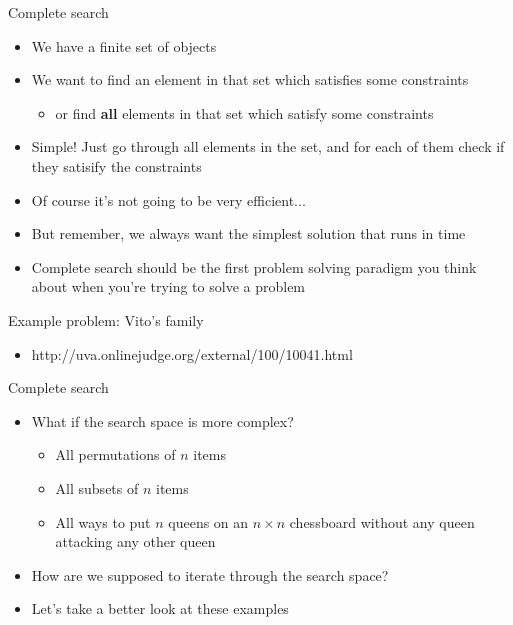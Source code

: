 \documentclass[12pt,t]{beamer}
\newcommand{\bi}{\begin{itemize}}
\newcommand{\ei}{\end{itemize}}
\begin{document}
\begin{frame}{Complete search}
    \vspace{5pt}
    \bi
        \item We have a finite set of objects
        \item We want to find an element in that set which satisfies some constraints
            \bi
                \item or find \textbf{all} elements in that set which satisfy some constraints
            \ei

        \vspace{5pt}
        \item Simple! Just go through all elements in the set, and for each of them check if they satisify the constraints
        \item Of course it's not going to be very efficient...
        \item But remember, we always want the simplest solution that runs in time
        \item Complete search should be the first problem solving paradigm you think about when you're trying to solve a problem
    \ei
\end{frame}

\begin{frame}{Example problem: Vito's family}
    \bi
        \item http://uva.onlinejudge.org/external/100/10041.html
    \ei
\end{frame}

\begin{frame}{Complete search}
    \vspace{20pt}
    \bi
        \item What if the search space is more complex?
            \bi
                \item All permutations of $n$ items
                \item All subsets of $n$ items
                \item All ways to put $n$ queens on an $n\times n$ chessboard without any queen attacking any other queen
            \ei
        \item How are we supposed to iterate through the search space?
        \item Let's take a better look at these examples
    \ei
\end{frame}
\end{document}

